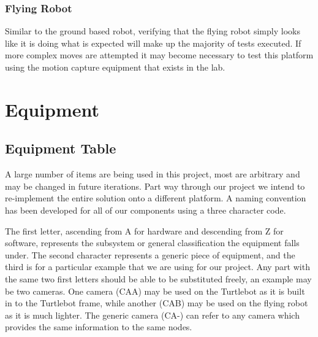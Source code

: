 \documentclass{article}
\begin{document}
	\subsubsection{Flying Robot}
	
	Similar to the ground based robot, verifying that the flying robot simply looks like it is doing what is expected will make up the majority of tests executed. If more complex moves are attempted it may become necessary to test this platform using the motion capture equipment that exists in the lab.


\section{Equipment}

	\subsection{Equipment Table}
	
	A large number of items are being used in this project, most are arbitrary and may be changed in future iterations. Part way through our project we intend to re-implement the entire solution onto a 	different platform. A naming convention has been developed for all of our components using a three character code.
	
	The first letter, ascending from A for hardware and descending from Z for software, represents the subsystem or general classification the equipment falls under. The second character represents a generic piece of equipment, and the third is for a particular example that we are using for our project. Any part with the same two first letters should be able to be substituted freely, an example may be two cameras. One camera (CAA) may be used on the Turtlebot as it is built in to the Turtlebot frame, while another (CAB) may be used on the flying robot as it is much lighter. The generic camera (CA-) can refer to any camera which provides the same information to the same nodes.
	
\end{document}

